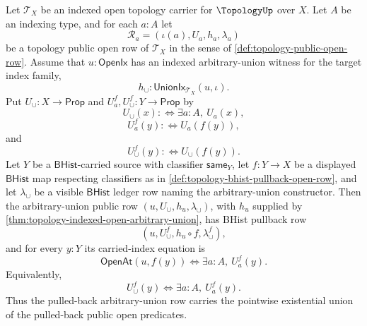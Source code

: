 \begin{theorem}
\label{thm:topology-pullback-open-row-arbitrary-union}
Let $\mathcal{T}_X$ be an indexed open topology carrier for $\TopologyUp$ over $X$. Let $A$ be an indexing type, and for each $a:A$ let
$$
\mathcal{R}_a=(\iota(a),U_a,h_a,\lambda_a)
$$
be a topology public open row of $\mathcal{T}_X$ in the sense of \autoref{def:topology-public-open-row}. Assume that $u:\mathsf{OpenIx}$ has an indexed arbitrary-union witness for the target index family,
$$
h_{\cup}:\mathsf{UnionIx}_{\mathcal{T}_X}(u,\iota).
$$
Put $U_{\cup}:X\to\mathsf{Prop}$ and $U_a^{f},U_{\cup}^{f}:Y\to\mathsf{Prop}$ by
$$
U_{\cup}(x):\Longleftrightarrow \exists a:A,\ U_a(x),
$$
$$
U_a^{f}(y):\Longleftrightarrow U_a(f(y)),
$$
and
$$
U_{\cup}^{f}(y):\Longleftrightarrow U_{\cup}(f(y)).
$$
Let $Y$ be a $\mathsf{BHist}$-carried source with classifier $\mathsf{same}_Y$, let $f:Y\to X$ be a displayed $\mathsf{BHist}$ map respecting classifiers as in \autoref{def:topology-bhist-pullback-open-row}, and let $\lambda_{\cup}$ be a visible $\mathsf{BHist}$ ledger row naming the arbitrary-union constructor. Then the arbitrary-union public row $(u,U_{\cup},h_u,\lambda_{\cup})$, with $h_u$ supplied by \autoref{thm:topology-indexed-open-arbitrary-union}, has BHist pullback row
$$
(u,U_{\cup}^{f},h_u\circ f,\lambda_{\cup}^{f}),
$$
and for every $y:Y$ its carried-index equation is
$$
\mathsf{OpenAt}(u,f(y))
\Longleftrightarrow
\exists a:A,\ U_a^{f}(y).
$$
Equivalently,
$$
U_{\cup}^{f}(y)
\Longleftrightarrow
\exists a:A,\ U_a^{f}(y).
$$
Thus the pulled-back arbitrary-union row carries the pointwise existential union of the pulled-back public open predicates.
\end{theorem}
